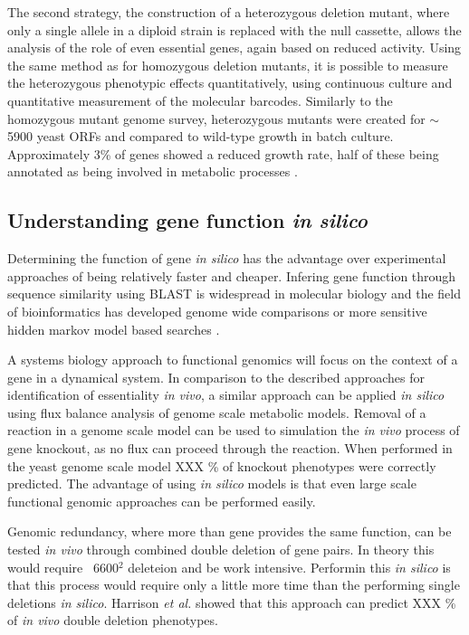 The second strategy, the construction of a heterozygous deletion mutant, where only a single allele in a diploid strain is replaced with the null cassette, allows the analysis of the role of even essential genes, again based on reduced activity. Using the same method as for homozygous deletion mutants, it is possible to measure the heterozygous phenotypic effects quantitatively, using continuous culture and quantitative measurement of the molecular barcodes. Similarly to the homozygous mutant genome survey, heterozygous mutants were created for $\sim$5900 yeast ORFs and compared to wild-type growth in batch culture. Approximately 3\% of genes showed a reduced growth rate, half of these being annotated as being involved in metabolic processes \cite{deutschbauer2005}.

\subsection{Understanding gene function \emph{in silico}}

Determining the function of gene \emph{in silico} has the advantage over experimental approaches of being relatively faster and cheaper. Infering gene function through sequence similarity using BLAST \cite{blast} is widespread in molecular biology and the field of bioinformatics has developed genome wide comparisons \cite{blat} or more sensitive hidden markov model based searches \cite{hmmer}.

A systems biology approach to functional genomics will focus on the context of a gene in a dynamical system. In comparison to the described approaches for identification of essentiality \emph{in vivo}, a similar approach can be applied \emph{in silico} using flux balance analysis of genome scale metabolic models. Removal of a reaction in a genome scale model can be used to simulation the \emph{in vivo} process of gene knockout, as no flux can proceed through the reaction. When performed in the yeast genome scale model XXX \% of knockout phenotypes were correctly predicted. The advantage of using \emph{in silico} models is that even large scale functional genomic approaches can be performed easily. 

Genomic redundancy, where more than gene provides the same function, can be tested \emph{in vivo} through combined double deletion of gene pairs. In theory this would require ~6600$^2$ deleteion and be work intensive. Performin this \emph{in silico} is that this process would require only a little more time than the performing single deletions \emph{in silico}. Harrison \emph{et al.} \cite{harisson2007} showed that this approach can predict XXX \% of \emph{in vivo} double deletion phenotypes.

